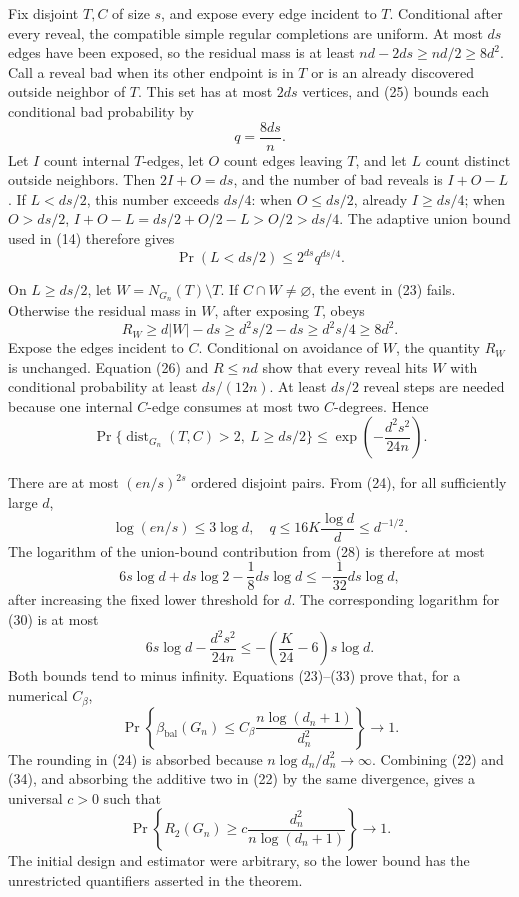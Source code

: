 Fix disjoint \(T,C\) of size \(s\), and expose every edge incident to
\(T\).  Conditional after every reveal, the compatible simple regular
completions are uniform.  At most \(ds\) edges have been exposed, so the
residual mass is at least \(nd-2ds\ge nd/2\ge8d^2\).  Call a reveal bad
when its other endpoint is in \(T\) or is an already discovered outside
neighbor of \(T\).  This set has at most \(2ds\) vertices, and (25) bounds
each conditional bad probability by
\[
q=\frac{8ds}{n}.
\tag{27}
\]
Let \(I\) count internal \(T\)-edges, let \(O\) count edges leaving
\(T\), and let \(L\) count distinct outside neighbors.  Then
\(2I+O=ds\), and the number of bad reveals is \(I+O-L\).  If
\(L<ds/2\), this number exceeds \(ds/4\): when \(O\le ds/2\), already
\(I\ge ds/4\); when \(O>ds/2\),
\(I+O-L=ds/2+O/2-L>O/2>ds/4\).  The adaptive union bound used in (14)
therefore gives
\[
\Pr(L<ds/2)\le2^{ds}q^{ds/4}.
\tag{28}
\]

On \(L\ge ds/2\), let \(W=N_{G_n}(T)\setminus T\).  If \(C\cap W\ne
\varnothing\), the event in (23) fails.  Otherwise the residual mass in
\(W\), after exposing \(T\), obeys
\[
R_W\ge d|W|-ds\ge d^2s/2-ds\ge d^2s/4\ge8d^2.
\tag{29}
\]
Expose the edges incident to \(C\).  Conditional on avoidance of \(W\),
the quantity \(R_W\) is unchanged.  Equation (26) and \(R\le nd\) show
that every reveal hits \(W\) with conditional probability at least
\(ds/(12n)\).  At least \(ds/2\) reveal steps are needed because one
internal \(C\)-edge consumes at most two \(C\)-degrees.  Hence
\[
\Pr\{\operatorname{dist}_{G_n}(T,C)>2,\ L\ge ds/2\}
\le\exp\!\left(-\frac{d^2s^2}{24n}\right).
\tag{30}
\]

There are at most \((en/s)^{2s}\) ordered disjoint pairs.  From (24), for
all sufficiently large \(d\),
\[
\log(en/s)\le3\log d,\quad
q\le16K\frac{\log d}{d}\le d^{-1/2}.
\tag{31}
\]
The logarithm of the union-bound contribution from (28) is therefore at
most
\[
6s\log d+ds\log2-\frac18ds\log d
\le-\frac1{32}ds\log d,
\tag{32}
\]
after increasing the fixed lower threshold for \(d\).  The corresponding
logarithm for (30) is at most
\[
6s\log d-\frac{d^2s^2}{24n}
\le-\left(\frac K{24}-6\right)s\log d.
\tag{33}
\]
Both bounds tend to minus infinity.  Equations (23)--(33) prove that, for
a numerical \(C_\beta\),
\[
\Pr\!\left\{\beta_{\mathrm{bal}}(G_n)
\le C_\beta\frac{n\log(d_n+1)}{d_n^2}\right\}\longrightarrow1.
\tag{34}
\]
The rounding in (24) is absorbed because
\(n\log d_n/d_n^2\to\infty\).  Combining (22) and (34), and absorbing the
additive two in (22) by the same divergence, gives a universal \(c>0\)
such that
\[
\Pr\!\left\{R_2(G_n)\ge
c\frac{d_n^2}{n\log(d_n+1)}\right\}\longrightarrow1.
\]
The initial design and estimator were arbitrary, so the lower bound has
the unrestricted quantifiers asserted in the theorem.

